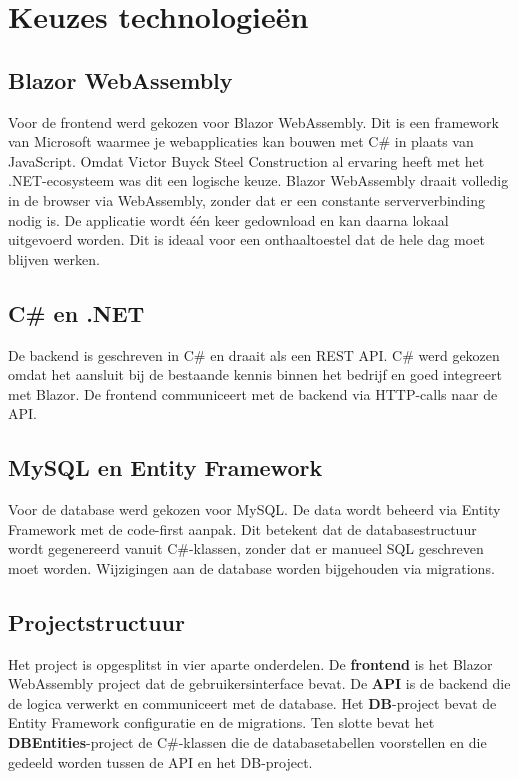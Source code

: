 \chapter{Keuzes technologieën}

\section{Blazor WebAssembly}

Voor de frontend werd gekozen voor Blazor WebAssembly. Dit is een framework 
van Microsoft waarmee je webapplicaties kan bouwen met C\# in plaats van 
JavaScript. Omdat Victor Buyck Steel Construction al ervaring heeft met het 
.NET-ecosysteem was dit een logische keuze.
\bigskip
Blazor WebAssembly draait volledig in de browser via WebAssembly, zonder 
dat er een constante serververbinding nodig is. De applicatie wordt één 
keer gedownload en kan daarna lokaal uitgevoerd worden. Dit is ideaal voor 
een onthaaltoestel dat de hele dag moet blijven werken.

\section{C\# en .NET}

De backend is geschreven in C\# en draait als een REST API. C\# werd gekozen 
omdat het aansluit bij de bestaande kennis binnen het bedrijf en goed 
integreert met Blazor. De frontend communiceert met de backend via HTTP-calls 
naar de API.

\section{MySQL en Entity Framework}

Voor de database werd gekozen voor MySQL. De data wordt beheerd via Entity 
Framework met de code-first aanpak. Dit betekent dat de databasestructuur 
wordt gegenereerd vanuit C\#-klassen, zonder dat er manueel SQL geschreven 
moet worden. Wijzigingen aan de database worden bijgehouden via migrations.

\section{Projectstructuur}

Het project is opgesplitst in vier aparte onderdelen. De \textbf{frontend} 
is het Blazor WebAssembly project dat de gebruikersinterface bevat. De 
\textbf{API} is de backend die de logica verwerkt en communiceert met de 
database. Het \textbf{DB}-project bevat de Entity Framework configuratie 
en de migrations. Ten slotte bevat het \textbf{DBEntities}-project de 
C\#-klassen die de databasetabellen voorstellen en die gedeeld worden 
tussen de API en het DB-project.
